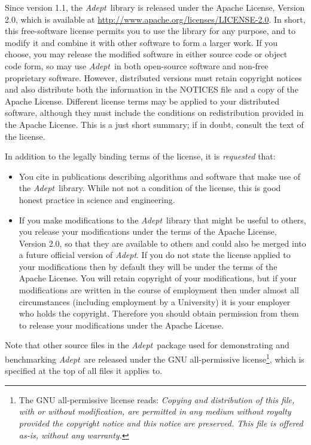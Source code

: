 \documentclass[a4,oneside]{book}
\def\Adept{\emph{Adept}}
\begin{document}
Since version 1.1, the \Adept\ library is released under the Apache
License, Version 2.0, which is available at
\url{http://www.apache.org/licenses/LICENSE-2.0}.  In short, this
free-software license permits you to use the library for any purpose,
and to modify it and combine it with other software to form a larger
work.  If you choose, you may release the modified software in either
source code or object code form, so may use \Adept\ in both
open-source software and non-free proprietary software. However,
distributed versions must retain copyright notices and also distribute
both the information in the NOTICES file and a copy of the Apache
License.  Different license terms may be applied to your distributed
software, although they must include the conditions on redistribution
provided in the Apache License.  This is a just short summary; if in
doubt, consult the text of the license.

In addition to the legally binding terms of the license, it is
\emph{requested} that:
\begin{itemize}
\item You cite \cite{Hogan2014} in publications describing algorithms
  and software that make use of the \Adept\ library. While not not a
  condition of the license, this is good honest practice in science
  and engineering.
\item If you make modifications to the \Adept\ library that might be
  useful to others, you release your modifications under the terms of
  the Apache License, Version 2.0, so that they are available to
  others and could also be merged into a future official version of
  \Adept. If you do not state the license applied to your
  modifications then by default they will be under the terms of the
  Apache License. You will retain copyright of your modifications, but
  if your modifications are written in the course of employment then
  under almost all circumstances (including employment by a
  University) it is your employer who holds the copyright.  Therefore
  you should obtain permission from them to release your modifications
  under the Apache License.
\end{itemize}

Note that other source files in the \Adept\ package used for
demonstrating and benchmarking \Adept\ are released under the GNU
all-permissive license\footnote{The GNU all-permissive license reads:
  \emph{Copying and distribution of this file, with or without
    modification, are permitted in any medium without royalty provided
    the copyright notice and this notice are preserved.  This file is
    offered as-is, without any warranty.}}, which is specified at the
top of all files it applies to.
\end{document}

